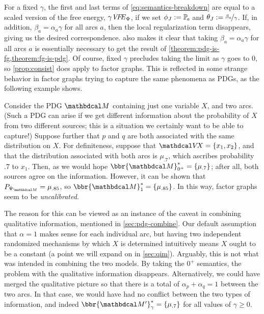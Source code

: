 For a fixed $\gamma$, the first and last terms
of \eqref{eq:semantics-breakdown} are equal to a scaled
version of the free energy, $\gamma\mathit{V\mkern-4mu F\mkern-4.5mu E}_\Phi$, 
if we set $\phi_J := \p_a$ and $\theta_J := \nicefrac{\beta_a}{\gamma}$.  
If, in addition, $\beta_a = {\alpha_a}\gamma$ for all
arcs $a$, then
the local regularization term disappears, giving us
the desired correspondence. 
%
%
 also makes it clear that 
taking $\beta_a = {\alpha_a} \gamma$ for all arcs $a$ is
essentially necessary to get the result of \cref{theorem:pdg-is-fg,theorem:fg-is-pdg}.
Of course, fixed $\gamma$ precludes 
    taking the limit as $\gamma$ goes to 0, so 
    \cref{prop:consist} does apply to factor graphs. 
This is reflected in some strange
behavior in factor graphs trying to capture the same phenomena as
PDGs, as the following example shows.

\begin{example}\label{ex:overdet}
Consider the PDG $\dg M$ containing just one variable
    $X$, and two arcs.
(Such a PDG can arise if we get different information about the probability of $X$ from two different sources; this is a situation we certainly want to be able to capture!)
Suppose further that $p$ and $q$ are both associated with the same distribution on $X$.
For definiteness, suppose that
$\V\!X = \{x_1,x_2\}$, and
that the distribution associated with both arcs is $\mu_{.7}$, which ascribes
probability $.7$ to $x_1$. Then, as we would hope  $\bbr{\dg M}^*_{0^+} =
\{\mu_{.7}\}$; after all, both sources agree on the information.
However, it can be shown that 
$\Pr_{\WFGof{\dg M}} = \mu_{.85}$, so  $\bbr{\dg M}_1^* = \{\mu_{.85}\}$.
In this way, factor graphs seem to be \emph{uncalibrated}. 

The reason for this can be viewed as an instance of the caveat in combining qualitative information, mentioned in \cref{sec:pdg-combine}.
Our default assumption that $\alpha = 1$ makes sense for each individual arc, but having two independent randomized mechanisms by which $X$ is determined intuitively means $X$ ought to be a constant (a point we will expand on in \cref{sec:qim}).
Arguably, this is not what was intended in combining the two models.
By taking the $0^+$ semantics, the problem with the qualitative information disappears. 
Alternatively, we could have merged the qualitative picture so that there is a total of $\alpha_p + \alpha_q = 1$ between the two arcs.
In that case, we would have had no conflict between the two types of information, and indeed $\bbr{\dg M'}_\gamma^* = \{ \mu_{.7} \}$ for all values of $\gamma \ge 0$.
\end{example}


